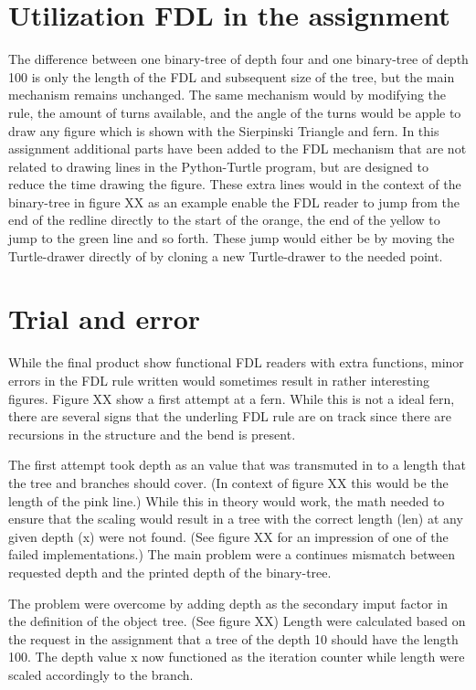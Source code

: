 \documentclass[titlepage]{article}
\begin{document}
\section{Utilization FDL in the assignment}
The difference between one binary-tree of depth four and one binary-tree of depth 100 is only the length of the FDL and subsequent size of the tree, but the main mechanism remains unchanged.  The same mechanism would by modifying the rule, the amount of turns available, and the angle of the turns would be apple to draw any figure which is shown with the Sierpinski Triangle and fern.  In this assignment additional parts have been added to the FDL mechanism that are not related to drawing lines in the Python-Turtle program, but are designed to reduce the time drawing the figure. These extra lines would in the context of the binary-tree in figure XX  as an example enable the FDL reader to jump from the end of the redline directly to the start of the orange, the end of the yellow to jump to the green line and so forth. These jump would either be by moving the Turtle-drawer directly of by cloning a new Turtle-drawer to the needed point. 

\section{Trial and error}
While the final product show functional FDL readers with extra functions, minor errors in the FDL rule written would sometimes result in rather interesting figures. Figure XX  show a first attempt at a fern. While this is not a ideal fern, there are several signs that the underling FDL rule are on track since there are recursions in the structure and the bend is present. 

The first attempt took depth as an value that was transmuted in to a length that the tree and branches should cover. (In context of figure XX  this would be the length of the pink line.) 
While this in theory would work, the math needed to ensure that the scaling would result in a tree with the correct length (len) at any given depth (x) were not found. (See figure XX  for an impression of one of the failed implementations.) The main problem were a continues mismatch between requested depth and the printed depth of the binary-tree. 

The problem were overcome by adding depth as the secondary imput factor in the definition of the object tree. (See figure XX)  Length were calculated based on the request in the assignment that a tree of the depth 10 should have the length 100. The depth value x now functioned as the iteration counter while length were scaled accordingly to the branch.  
\end{document}
